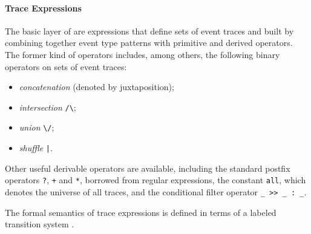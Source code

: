 \paragraph{Trace Expressions}
The basic layer of \rml are expressions that define sets of event traces and built by combining together event type patterns with primitive and derived operators.
The former kind of operators includes, among others, the following binary operators on sets of event traces:
\begin{itemize}
	\item \emph{concatenation} (denoted by juxtaposition);
	\item \emph{intersection} \lstinline{/\};
	\item \emph{union} \lstinline{\/}; 
	\item \emph{shuffle} \lstinline{|}. 
\end{itemize}
Other useful derivable operators are available, including the standard postfix operators
\lstinline{?}, \lstinline{+} and \lstinline{*}, borrowed from regular expressions,  the constant \lstinline{all}, which denotes the universe of all traces,
and the  conditional filter operator \lstinline{_ >> _ : _}.

The formal semantics of trace expressions is defined in terms of a labeled transition system \cite{RML2021}.

